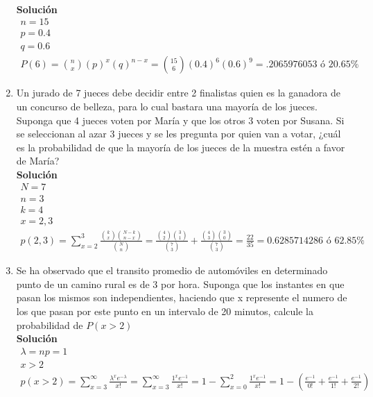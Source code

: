 \begin{enumerate}
    \\\textbf{Solución}
    \\
    \begin{gather*}
    n=15\\
    p=0.4\\
    q=0.6\\
    P(6) = \binom{n}{x}\left(p\right)^{x}\left(q\right)^{n-x}=\binom{15}{6}(0.4)^{6}(0.6)^{9}=.2065976053 \text{ ó } 20.65\%
    \end{gather*}
    \item Un jurado de 7 jueces debe decidir entre 2 finalistas quien es la ganadora de un concurso de belleza, para lo cual bastara una mayoría de los jueces. Suponga que 4 jueces voten por María y que los otros 3 voten por Susana. Si se seleccionan al azar 3 jueces y se les pregunta por quien van a votar, ¿cuál es la probabilidad de que la mayoría de los jueces de la muestra estén a favor de María?
    \\\textbf{Solución}
    \\
    \begin{gather*}
    N=7\\
    n=3\\
    k=4\\
    x=2, 3\\
    p(2, 3) = \sum _{x=2}^{3} \frac{\binom{k}{x}\binom{N-k}{n-x}}{\binom{N}{n}} = \frac{\binom{4}{2}\binom{3}{1}}{\binom{7}{3}} + \frac{\binom{4}{3}\binom{3}{0}}{\binom{7}{3}} = \frac{22}{35} =0.6285714286 \text{ ó } 62.85\%
    \end{gather*}
    \item Se ha observado que el transito promedio de automóviles en determinado punto de un camino rural es de 3 por hora. Suponga que los instantes en que pasan los mismos son independientes, haciendo que x represente el numero de los que pasan por este punto en un intervalo de 20 minutos, calcule la probabilidad de $P(x > 2)$
    \\\textbf{Solución}
    \\
    \begin{gather*}
    \lambda = np = 1 \tag{ cada 20 min}\\
    x>2\\
    p(x>2) =\sum _{x=3}^{\infty }\frac{{\lambda}^{x}{e}^{-\lambda}}{x!}=\sum _{x=3}^{\infty }\frac{{1}^{x}{e}^{-1}}{x!}=1 - \sum _{x=0}^{2}\frac{{1}^{x}{e}^{-1}}{x!} = 1- \left( \frac{{e}^{-1}}{0!}+\frac{{e}^{-1}}{1!}+\frac{{e}^{-1}}{2!} \right) \\

\end{gather*}
\end{enumerate}
